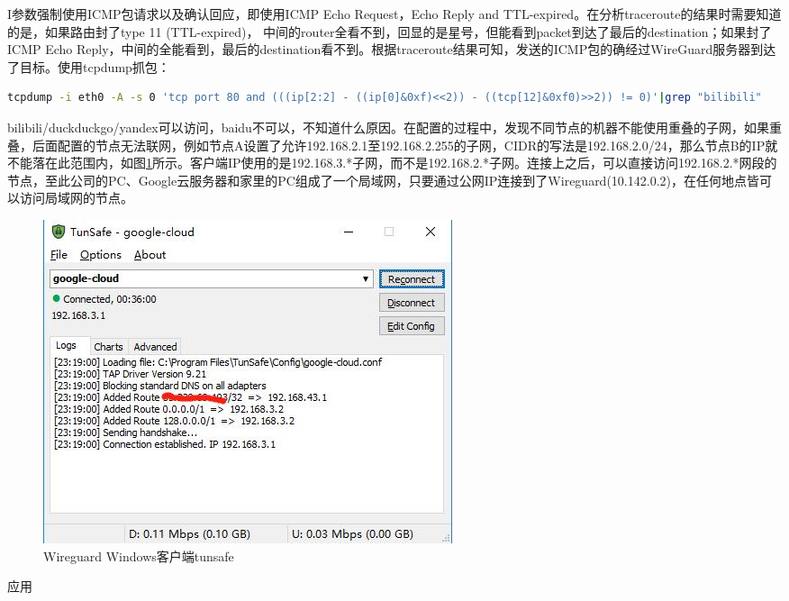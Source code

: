 \documentclass[8pt]{book}
\makeatletter
\numberwithin{dummy}{section}
\theoremstyle{ocrenumbox}
\theoremstyle{blacknumex}
\theoremstyle{blacknumbox}
\theoremstyle{ocrenum}
\renewcommand{\subsection}{\@startsection {subsection}{2}{\z@}
	{-3ex \@plus -0.1ex \@minus -.4ex}
	{0.5ex \@plus.2ex }
	{\normalfont\sffamily\bfseries}}
\makeatother
\begin{document}
I参数强制使用ICMP包请求以及确认回应，即使用ICMP Echo Request，Echo Reply and TTL-expired。在分析traceroute的结果时需要知道的是，如果路由封了type 11 (TTL-expired)， 中间的router全看不到，回显的是星号，但能看到packet到达了最后的destination；如果封了ICMP Echo Reply，中间的全能看到，最后的destination看不到。根据traceroute结果可知，发送的ICMP包的确经过WireGuard服务器到达了目标。使用tcpdump抓包：

\begin{lstlisting}[language=Bash]
tcpdump -i eth0 -A -s 0 'tcp port 80 and (((ip[2:2] - ((ip[0]&0xf)<<2)) - ((tcp[12]&0xf0)>>2)) != 0)'|grep "bilibili"
\end{lstlisting}

bilibili/duckduckgo/yandex可以访问，baidu不可以，不知道什么原因。在配置的过程中，发现不同节点的机器不能使用重叠的子网，如果重叠，后面配置的节点无法联网，例如节点A设置了允许192.168.2.1至192.168.2.255的子网，CIDR的写法是192.168.2.0/24，那么节点B的IP就不能落在此范围内，如图\ref{fig:wireguardtunsafeclient}所示。客户端IP使用的是192.168.3.*子网，而不是192.168.2.*子网。连接上之后，可以直接访问192.168.2.*网段的节点，至此公司的PC、Google云服务器和家里的PC组成了一个局域网，只要通过公网IP连接到了Wireguard(10.142.0.2)，在任何地点皆可以访问局域网的节点。

\begin{figure}[htbp]
	\centering
	\includegraphics[scale=0.7]{wireguardtunsafeclient.jpg}
	\caption{Wireguard Windows客户端tunsafe}
	\label{fig:wireguardtunsafeclient}
\end{figure}

\subsection{应用}
\end{document}
